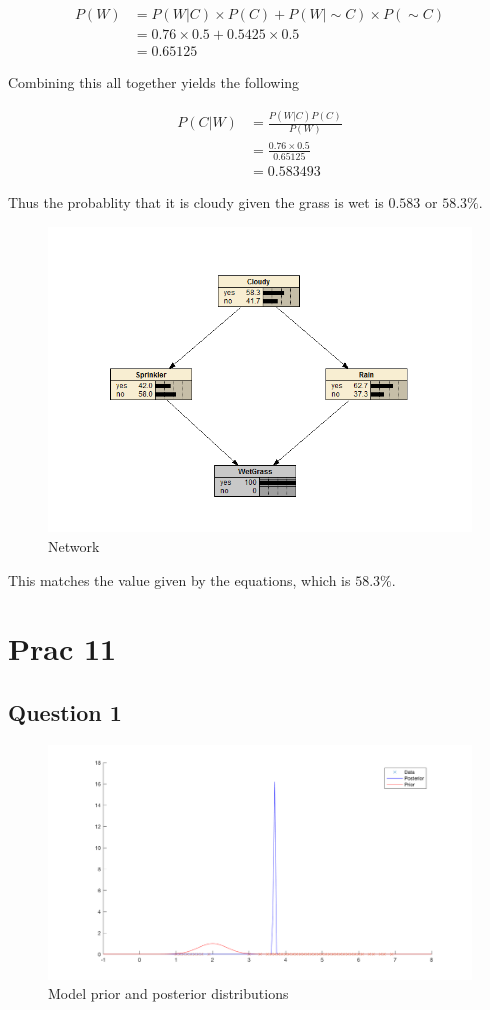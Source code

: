 \begin{align*}
    P(W) &= P(W|C) \times P(C) + P(W|\sim C) \times P(\sim C)\\
    &= 0.76 \times 0.5 + 0.5425 \times 0.5\\
    &= 0.65125
\end{align*}

Combining this all together yields the following

\begin{align*}
    P(C|W) &= \frac{P(W|C) P(C)}{P(W)}\\
    &= \frac{0.76 \times 0.5}{0.65125}\\
    &= 0.583493
\end{align*}

Thus the probablity that it is cloudy given the grass is wet is $0.583$ or $58.3\%$.

\begin{figure}[H]
    \includegraphics[width=\linewidth]{../../pracs/prac10/q4}
    \centering
    \caption{Network}
\end{figure}

This matches the value given by the equations, which is $58.3\%$.

\section*{Prac 11}

\subsection*{Question 1}



\begin{figure}[H]
    \includegraphics[width=\linewidth]{../../pracs/prac11/q1_graph}
    \centering
    \caption{Model prior and posterior distributions}
\end{figure}


